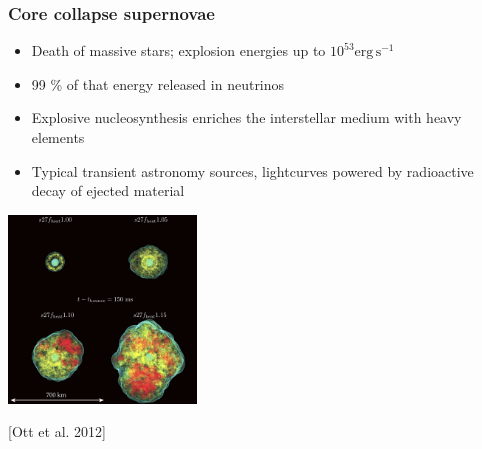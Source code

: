 \documentclass{beamer}
\begin{document}
\begin{frame}
\frametitle{Core collapse supernovae}
\hspace{-0.5cm}
\begin{minipage}[]{0.45\textwidth}
\begin{itemize}
\item Death of massive stars; explosion energies up to $10^{53} \mathrm{erg\, s^{-1}}$
\item 99 \% of that energy released in neutrinos
\item Explosive nucleosynthesis enriches the interstellar medium with heavy elements
\item Typical transient astronomy sources, lightcurves powered by radioactive decay of ejected material  
\end{itemize}
\end{minipage}
\hspace{0.5cm}
\begin{minipage}[]{0.4\textwidth}
\begin{minipage}[]{\textwidth}
\includegraphics[width=5.0cm]{./s27WHW02_fh_all_vol_drasco.png}
\end{minipage}

\begin{minipage}[]{\textwidth}
\small [Ott et al. 2012]
\end{minipage}
\end{minipage}

\end{frame}
\end{document}
